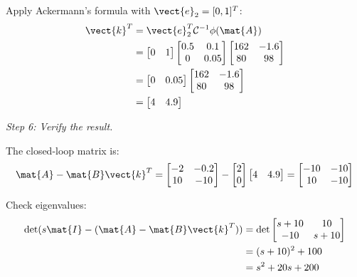 Apply Ackermann's formula with $\vect{e}_2 = [0, 1]^T$:
\begin{align}
\vect{k}^T &= \vect{e}_2^T\mathcal{C}^{-1}\phi(\mat{A}) \nonumber \\
&= \begin{bmatrix} 0 & 1 \end{bmatrix}
\begin{bmatrix} 0.5 & 0.1 \\ 0 & 0.05 \end{bmatrix}
\begin{bmatrix} 162 & -1.6 \\ 80 & 98 \end{bmatrix} \nonumber \\
&= \begin{bmatrix} 0 & 0.05 \end{bmatrix}
\begin{bmatrix} 162 & -1.6 \\ 80 & 98 \end{bmatrix} \nonumber \\
&= \begin{bmatrix} 4 & 4.9 \end{bmatrix}
\end{align}

\textit{Step 6: Verify the result.}

The closed-loop matrix is:
\begin{equation}
\mat{A} - \mat{B}\vect{k}^T = \begin{bmatrix} -2 & -0.2 \\ 10 & -10 \end{bmatrix} -
\begin{bmatrix} 2 \\ 0 \end{bmatrix}\begin{bmatrix} 4 & 4.9 \end{bmatrix}
= \begin{bmatrix} -10 & -10 \\ 10 & -10 \end{bmatrix}
\end{equation}

Check eigenvalues:
\begin{align}
\det(s\mat{I} - (\mat{A} - \mat{B}\vect{k}^T)) &= \det\begin{bmatrix} s+10 & 10 \\ -10 & s+10 \end{bmatrix} \nonumber \\
&= (s+10)^2 + 100 \nonumber \\
&= s^2 + 20s + 200
\end{align}

